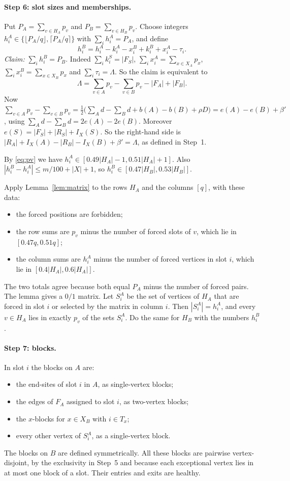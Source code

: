 \documentclass[11pt]{article}
\theoremstyle{definition}
\begin{document}
\paragraph{Step 6: slot sizes and memberships.} Put $P_A=\sum_{v\in H_A}p_v$ and $P_B=\sum_{v\in H_B}p_v$. Choose integers $h^A_i\in\{\lfloor P_A/q\rfloor,\lceil P_A/q\rceil\}$ with $\sum_ih^A_i=P_A$, and define
\begin{equation}\label{eq:hB}
h^B_i=h^A_i-k^A_i-x^B_i+k^B_i+x^A_i-\tau_i .
\end{equation}
\emph{Claim:} $\sum_ih^B_i=P_B$. Indeed $\sum_ik^S_i=|F_S|$, $\sum_ix^A_i=\sum_{x\in X_A}p_x$, $\sum_ix^B_i=\sum_{x\in X_B}p_x$ and $\sum_i\tau_i=\Lambda$. So the claim is equivalent to
\[
\Lambda=\sum_{v\in A}p_v-\sum_{v\in B}p_v-|F_A|+|F_B| .
\]
Now $\sum_{v\in A}p_v-\sum_{v\in B}p_v=\tfrac12\bigl(\sum_Ad-\sum_Bd+b(A)-b(B)+\rho D\bigr)=e(A)-e(B)+\beta'$, using $\sum_Ad-\sum_Bd=2e(A)-2e(B)$. Moreover $e(S)=|F_S|+|R_S|+I_X(S)$. So the right-hand side is $|R_A|+I_X(A)-|R_B|-I_X(B)+\beta'=\Lambda$, as defined in Step~1.

By \eqref{eq:pv} we have $h^A_i\in[0.49|H_A|-1,0.51|H_A|+1]$. Also $|h^B_i-h^A_i|\le m/100+|X|+1$, so $h^B_i\in[0.47|H_B|,0.53|H_B|]$.

Apply Lemma~\ref{lem:matrix} to the rows $H_A$ and the columns $[q]$, with these data:
\begin{itemize}[nosep]
\item the forced positions are forbidden;
\item the row sums are $p_v$ minus the number of forced slots of $v$, which lie in $[0.47q,0.51q]$;
\item the column sums are $h^A_i$ minus the number of forced vertices in slot $i$, which lie in $[0.4|H_A|,0.6|H_A|]$.
\end{itemize}
The two totals agree because both equal $P_A$ minus the number of forced pairs. The lemma gives a $0/1$ matrix. Let $S^A_i$ be the set of vertices of $H_A$ that are forced in slot $i$ or selected by the matrix in column $i$. Then $|S^A_i|=h^A_i$, and every $v\in H_A$ lies in exactly $p_v$ of the sets $S^A_i$. Do the same for $H_B$ with the numbers $h^B_i$.

\paragraph{Step 7: blocks.} In slot $i$ the blocks on $A$ are:
\begin{itemize}[nosep]
\item the end-sites of slot $i$ in $A$, as single-vertex blocks;
\item the edges of $F_A$ assigned to slot $i$, as two-vertex blocks;
\item the $x$-blocks for $x\in X_B$ with $i\in T_x$;
\item every other vertex of $S^A_i$, as a single-vertex block.
\end{itemize}
The blocks on $B$ are defined symmetrically. All these blocks are pairwise vertex-disjoint, by the exclusivity in Step~5 and because each exceptional vertex lies in at most one block of a slot. Their entries and exits are healthy.
\end{document}
